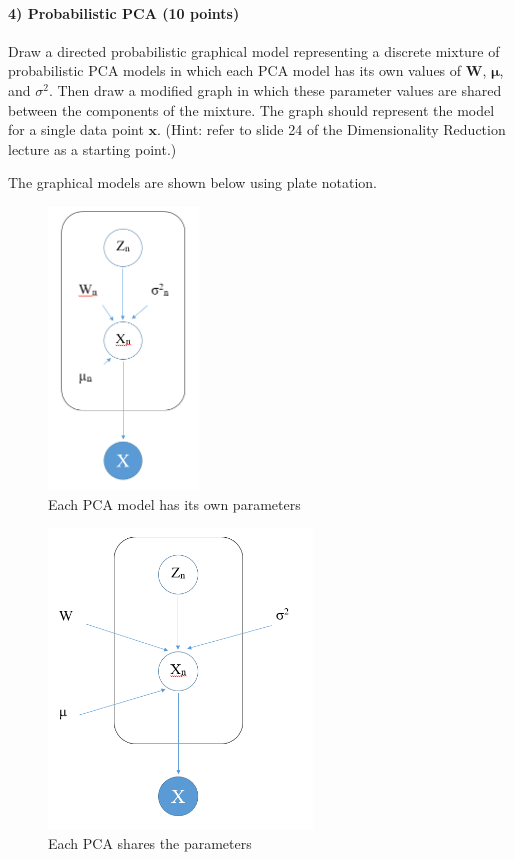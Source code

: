 \documentclass{article}
\begin{document}
\newpage
\paragraph{4) Probabilistic PCA (10 points)}

Draw a directed probabilistic graphical model representing a discrete mixture of probabilistic PCA models in which each PCA model has its own values of $\mathbf{W}$, $\boldsymbol{\mu}$, and $\sigma^2$. Then draw a modified graph in which these parameter values are shared between the components of the mixture. The graph should represent the model for a single data point $\mathbf{x}$. (Hint: refer to slide 24 of the Dimensionality Reduction lecture as a starting point.)
\begin{soln}
	The graphical models are shown below using plate notation.
	\begin{figure}[ht]
		\centering
		\includegraphics[width=4cm]{4a.PNG}
		\caption{Each PCA model has its own parameters}
	\end{figure}
	\begin{figure}[H]
		\centering
		\includegraphics[width=7cm]{4b.PNG}
		\caption{Each PCA shares the parameters}
	\end{figure}	
\end{soln}
\end{document}
